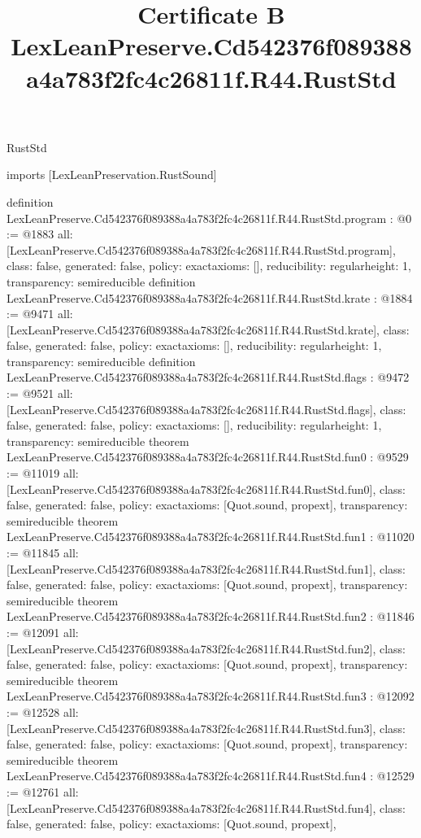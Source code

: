 \begin{lexlean}{RustStd}
\title{Certificate B LexLeanPreserve.Cd542376f089388a4a783f2fc4c26811f.R44.RustStd}
\begin{coremodule}
imports [LexLeanPreservation.RustSound]

definition LexLeanPreserve.Cd542376f089388a4a783f2fc4c26811f.R44.RustStd.program : @0 := @1883 {
  all: [LexLeanPreserve.Cd542376f089388a4a783f2fc4c26811f.R44.RustStd.program],
  class: false,
  generated: false,
  policy: exact{axioms: []},
  reducibility: regular{height: 1},
  transparency: semireducible
}
definition LexLeanPreserve.Cd542376f089388a4a783f2fc4c26811f.R44.RustStd.krate : @1884 := @9471 {
  all: [LexLeanPreserve.Cd542376f089388a4a783f2fc4c26811f.R44.RustStd.krate],
  class: false,
  generated: false,
  policy: exact{axioms: []},
  reducibility: regular{height: 1},
  transparency: semireducible
}
definition LexLeanPreserve.Cd542376f089388a4a783f2fc4c26811f.R44.RustStd.flags : @9472 := @9521 {
  all: [LexLeanPreserve.Cd542376f089388a4a783f2fc4c26811f.R44.RustStd.flags],
  class: false,
  generated: false,
  policy: exact{axioms: []},
  reducibility: regular{height: 1},
  transparency: semireducible
}
theorem LexLeanPreserve.Cd542376f089388a4a783f2fc4c26811f.R44.RustStd.fun0 : @9529 := @11019 {
  all: [LexLeanPreserve.Cd542376f089388a4a783f2fc4c26811f.R44.RustStd.fun0],
  class: false,
  generated: false,
  policy: exact{axioms: [Quot.sound, propext]},
  transparency: semireducible
}
theorem LexLeanPreserve.Cd542376f089388a4a783f2fc4c26811f.R44.RustStd.fun1 : @11020 := @11845 {
  all: [LexLeanPreserve.Cd542376f089388a4a783f2fc4c26811f.R44.RustStd.fun1],
  class: false,
  generated: false,
  policy: exact{axioms: [Quot.sound, propext]},
  transparency: semireducible
}
theorem LexLeanPreserve.Cd542376f089388a4a783f2fc4c26811f.R44.RustStd.fun2 : @11846 := @12091 {
  all: [LexLeanPreserve.Cd542376f089388a4a783f2fc4c26811f.R44.RustStd.fun2],
  class: false,
  generated: false,
  policy: exact{axioms: [Quot.sound, propext]},
  transparency: semireducible
}
theorem LexLeanPreserve.Cd542376f089388a4a783f2fc4c26811f.R44.RustStd.fun3 : @12092 := @12528 {
  all: [LexLeanPreserve.Cd542376f089388a4a783f2fc4c26811f.R44.RustStd.fun3],
  class: false,
  generated: false,
  policy: exact{axioms: [Quot.sound, propext]},
  transparency: semireducible
}
theorem LexLeanPreserve.Cd542376f089388a4a783f2fc4c26811f.R44.RustStd.fun4 : @12529 := @12761 {
  all: [LexLeanPreserve.Cd542376f089388a4a783f2fc4c26811f.R44.RustStd.fun4],
  class: false,
  generated: false,
  policy: exact{axioms: [Quot.sound, propext]},
}
\end{coremodule}
\end{lexlean}

